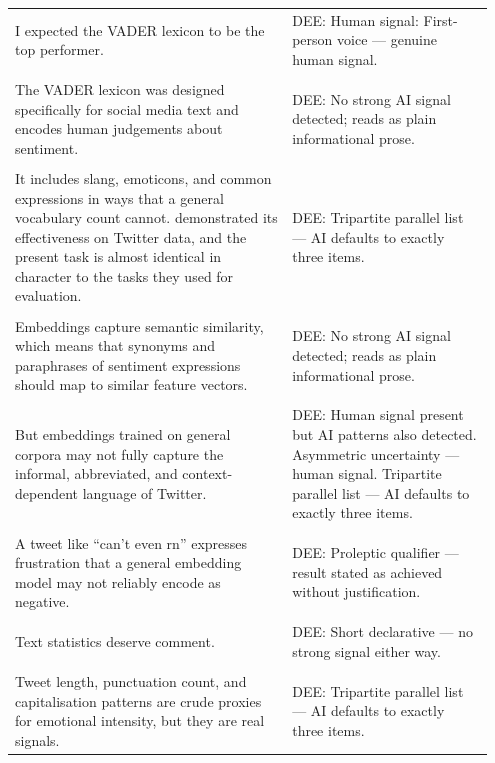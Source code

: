 \documentclass[11pt]{article}
\begin{document}
\begin{longtable}{|p{0.55\linewidth}|p{0.40\linewidth}|}
\hline
\rule{0pt}{3.5cm} & \\
\hline
I expected the VADER lexicon to be the top performer. & DEE: Human signal: First-person voice --- genuine human signal. \\[2pt]
\hline
\rule{0pt}{3.5cm} & \\
\hline
The VADER lexicon was designed specifically for social media text and encodes human judgements about sentiment. & DEE: No strong AI signal detected; reads as plain informational prose. \\[2pt]
\hline
\rule{0pt}{3.5cm} & \\
\hline
It includes slang, emoticons, and common expressions in ways that a general vocabulary count cannot. demonstrated its effectiveness on Twitter data, and the present task is almost identical in character to the tasks they used for evaluation. & DEE: Tripartite parallel list --- AI defaults to exactly three items. \\[2pt]
\hline
\rule{0pt}{3.5cm} & \\
\hline
Embeddings capture semantic similarity, which means that synonyms and paraphrases of sentiment expressions should map to similar feature vectors. & DEE: No strong AI signal detected; reads as plain informational prose. \\[2pt]
\hline
\rule{0pt}{3.5cm} & \\
\hline
But embeddings trained on general corpora may not fully capture the informal, abbreviated, and context-dependent language of Twitter. & DEE: Human signal present but AI patterns also detected. Asymmetric uncertainty --- human signal. Tripartite parallel list --- AI defaults to exactly three items. \\[2pt]
\hline
\rule{0pt}{3.5cm} & \\
\hline
A tweet like ``can't even rn'' expresses frustration that a general embedding model may not reliably encode as negative. & DEE: Proleptic qualifier --- result stated as achieved without justification. \\[2pt]
\hline
\rule{0pt}{3.5cm} & \\
\hline
Text statistics deserve comment. & DEE: Short declarative --- no strong signal either way. \\[2pt]
\hline
\rule{0pt}{3.5cm} & \\
\hline
Tweet length, punctuation count, and capitalisation patterns are crude proxies for emotional intensity, but they are real signals. & DEE: Tripartite parallel list --- AI defaults to exactly three items. \\[2pt]

\end{longtable}
\end{document}
